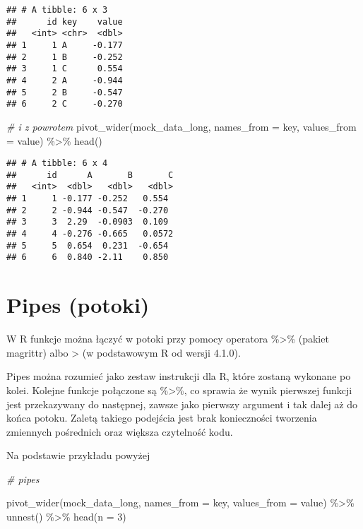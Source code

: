 \documentclass[
]{book}
\newenvironment{Shaded}{\begin{snugshade}}{\end{snugshade}}
\newcommand{\AttributeTok}[1]{\textcolor[rgb]{0.77,0.63,0.00}{#1}}
\newcommand{\CommentTok}[1]{\textcolor[rgb]{0.56,0.35,0.01}{\textit{#1}}}
\newcommand{\DecValTok}[1]{\textcolor[rgb]{0.00,0.00,0.81}{#1}}
\newcommand{\FunctionTok}[1]{\textcolor[rgb]{0.00,0.00,0.00}{#1}}
\newcommand{\NormalTok}[1]{#1}
\newcommand{\SpecialCharTok}[1]{\textcolor[rgb]{0.00,0.00,0.00}{#1}}
\begin{document}
\begin{verbatim}
## # A tibble: 6 x 3
##      id key    value
##   <int> <chr>  <dbl>
## 1     1 A     -0.177
## 2     1 B     -0.252
## 3     1 C      0.554
## 4     2 A     -0.944
## 5     2 B     -0.547
## 6     2 C     -0.270
\end{verbatim}

\begin{Shaded}
\begin{Highlighting}[]
\CommentTok{\# i z powrotem}
\FunctionTok{pivot\_wider}\NormalTok{(mock\_data\_long, }\AttributeTok{names\_from =}\NormalTok{ key, }\AttributeTok{values\_from =}\NormalTok{ value) }\SpecialCharTok{\%\textgreater{}\%} \FunctionTok{head}\NormalTok{()}
\end{Highlighting}
\end{Shaded}

\begin{verbatim}
## # A tibble: 6 x 4
##      id      A       B       C
##   <int>  <dbl>   <dbl>   <dbl>
## 1     1 -0.177 -0.252   0.554 
## 2     2 -0.944 -0.547  -0.270 
## 3     3  2.29  -0.0903  0.109 
## 4     4 -0.276 -0.665   0.0572
## 5     5  0.654  0.231  -0.654 
## 6     6  0.840 -2.11    0.850
\end{verbatim}

\hypertarget{pipes-potoki}{%
\section{Pipes (potoki)}\label{pipes-potoki}}

W R funkcje można łączyć w potoki przy pomocy operatora \%\textgreater\% (pakiet magrittr) albo \textbar\textgreater{} (w podstawowym R od wersji 4.1.0).

Pipes można rozumieć jako zestaw instrukcji dla R, które zostaną wykonane po kolei. Kolejne funkcje połączone są \%\textgreater\%, co sprawia że wynik pierwszej funkcji jest przekazywany do następnej, zawsze jako pierwszy argument i tak dalej aż do końca potoku. Zaletą takiego podejścia jest brak konieczności tworzenia zmiennych pośrednich oraz większa czytelność kodu.

Na podstawie przykładu powyżej

\begin{Shaded}
\begin{Highlighting}[]
\CommentTok{\# pipes}

\FunctionTok{pivot\_wider}\NormalTok{(mock\_data\_long, }\AttributeTok{names\_from =}\NormalTok{ key, }\AttributeTok{values\_from =}\NormalTok{ value) }\SpecialCharTok{\%\textgreater{}\%} \FunctionTok{unnest}\NormalTok{() }\SpecialCharTok{\%\textgreater{}\%} \FunctionTok{head}\NormalTok{(}\AttributeTok{n =} \DecValTok{3}\NormalTok{)}
\end{Highlighting}
\end{Shaded}
\end{document}
